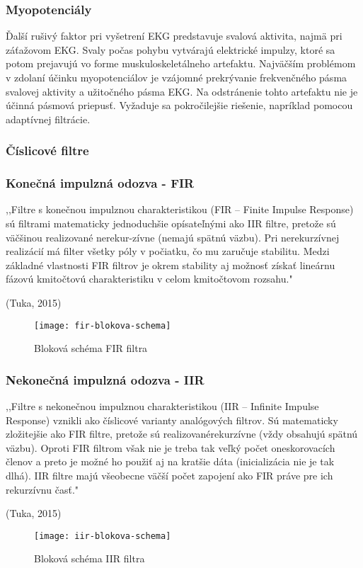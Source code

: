 \documentclass[titlepage,12pt]{article}
\begin{document}
\subsubsection{Myopotenciály}
Ďalší rušivý faktor pri vyšetrení EKG predstavuje svalová aktivita, najmä pri záťažovom EKG. Svaly počas pohybu vytvárajú elektrické impulzy, ktoré sa potom prejavujú vo forme muskuloskeletálneho artefaktu. Najväčším problémom v zdolaní účinku myopotenciálov je vzájomné prekrývanie frekvenčného pásma svalovej aktivity a užitočného pásma EKG. Na odstránenie tohto artefaktu nie je účinná pásmová priepusť. Vyžaduje sa pokročilejšie riešenie, napríklad pomocou adaptívnej filtrácie. 

\newpage
\subsubsection{Číslicové filtre}

\subsubsection*{Konečná impulzná odozva - FIR}
,,Filtre s konečnou impulznou charakteristikou (FIR – Finite Impulse Response) sú filtrami  matematicky  jednoduchšie  opísateľnými  ako  IIR  filtre,  pretože  sú  väčšinou realizované nerekur-zívne (nemajú spätnú väzbu). Pri nerekurzívnej realizácií má filter všetky póly v počiatku, čo mu zaručuje stabilitu. Medzi základné vlastnosti FIR filtrov je okrem stability aj možnosť získať lineárnu fázovú kmitočtovú charakteristiku v celom kmitočtovom rozsahu." 
\begin{flushright}
(Tuka, 2015)
\end{flushright}

\begin{figure}[!ht]
\begin{center}
\texttt{[image: fir-blokova-schema]}
\caption{Bloková schéma FIR filtra}
\end{center}
\end{figure}

\subsubsection*{Nekonečná impulzná odozva - IIR}
,,Filtre s nekonečnou impulznou charakteristikou (IIR – Infinite Impulse Response) vznikli ako číslicové varianty analógových filtrov. Sú matematicky zložitejšie ako FIR filtre, pretože  sú  realizovanérekurzívne  (vždy  obsahujú  spätnú  väzbu).  Oproti  FIR filtrom však nie je treba tak veľký počet oneskorovacích členov a preto je možné ho použiť aj na kratšie dáta (inicializácia nie je tak dlhá). IIR filtre majú všeobecne väčší počet zapojení ako FIR práve pre ich rekurzívnu časť."
\begin{flushright}
(Tuka, 2015)
\end{flushright}
\begin{figure}[!ht]
\begin{center}
\texttt{[image: iir-blokova-schema]}
\caption{Bloková schéma IIR filtra}
\end{center}
\end{figure}
\end{document}

